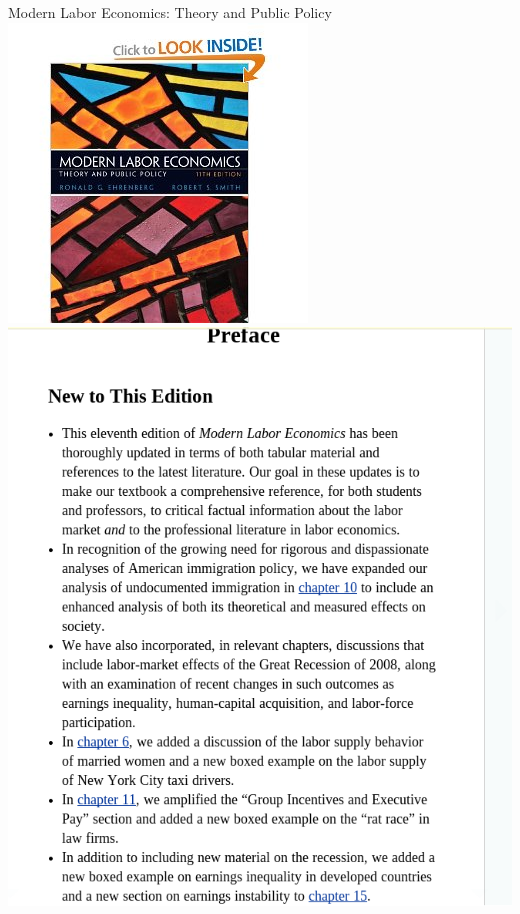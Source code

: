 \documentclass[xcolor=table,compress]{beamer}
\begin{document}
\begin{frame}{Modern Labor Economics: Theory and Public Policy}
\includegraphics[height=.7\textheight]{EhrenbergSmith.jpg}
\pause
\includegraphics[height=.7\textheight]{EhrenbergSmith-preface-11.png}
\end{frame}
\end{document}
